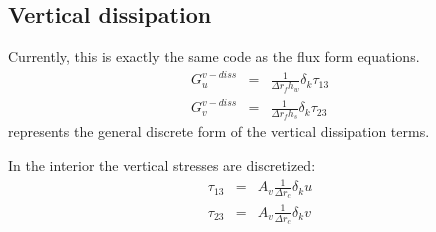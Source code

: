 \subsection{Vertical dissipation}

Currently, this is exactly the same code as the flux form equations.
\begin{eqnarray}
G_u^{v-diss} & = &
\frac{1}{\Delta r_f h_w} \delta_k \tau_{13} \\
G_v^{v-diss} & = &
\frac{1}{\Delta r_f h_s} \delta_k \tau_{23}
\end{eqnarray}
represents the general discrete form of the vertical dissipation terms.

In the interior the vertical stresses are discretized:
\begin{eqnarray}
\tau_{13} & = & A_v \frac{1}{\Delta r_c} \delta_k u \\
\tau_{23} & = & A_v \frac{1}{\Delta r_c} \delta_k v
\end{eqnarray}

